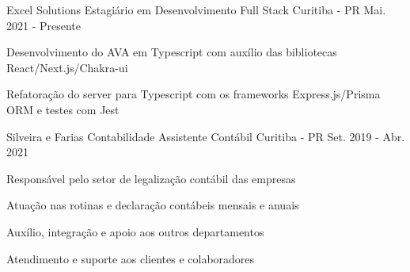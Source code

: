 

\begin{cventries}

\cventry
    {Excel Solutions} %
    {Estagiário em Desenvolvimento Full Stack} %
    {Curitiba - PR} %
    {Mai. 2021 - Presente} %
    {
      \begin{cvitems} %
        \item {Desenvolvimento do AVA em Typescript com auxílio das bibliotecas React/Next.js/Chakra-ui}
        \item {Refatoração do server para Typescript com os frameworks Express.js/Prisma ORM e  testes com Jest}
      \end{cvitems}
    }

\cventry
    {Silveira e Farias Contabilidade}  %
    {Assistente Contábil} %
    {Curitiba - PR} %
    {Set. 2019 - Abr. 2021} %
    {
      \begin{cvitems} %
        \item {Responsável pelo setor de legalização contábil das empresas}
        \item {Atuação nas rotinas e declaração contábeis mensais e anuais }
        \item {Auxílio, integração e apoio aos outros departamentos}
        \item {Atendimento e suporte aos clientes e colaboradores }
      \end{cvitems}
    }

\end{cventries}
